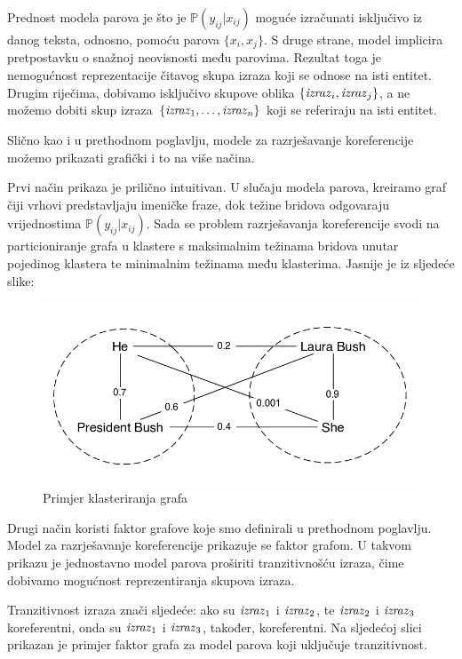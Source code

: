 \documentclass[a4paper,twoside,12pt]{memoir} %
\newcommand{\ti}[1]{\textit{#1\/}}
\begin{document}
	\bigskip

	Prednost modela parova je što je $\mathbb{P} (y_{ij} | x_{ij})$  moguće izračunati isključivo iz danog teksta, odnosno, pomoću parova $\{x_i, x_j\}$. S druge strane, model implicira pretpostavku o snažnoj neovisnosti među parovima. Rezultat toga je nemogućnost reprezentacije čitavog skupa izraza koji se odnose na isti entitet. Drugim riječima, dobivamo isključivo skupove oblika $\{ \ti{izraz}_i, \ti{izraz}_j\}$, a ne možemo dobiti skup izraza $\{ \ti{izraz}_1, \ldots, \ti{izraz}_n\}$ koji se referiraju na isti entitet.

	\bigskip

	Slično kao i u prethodnom poglavlju, modele za razrješavanje koreferencije možemo prikazati grafički i to na više načina.

	Prvi način prikaza je prilično intuitivan. U slučaju modela parova, kreiramo graf čiji vrhovi predstavljaju imeničke fraze, dok težine bridova odgovaraju vrijednostima $\mathbb{P}(y_{ij} | x_{ij})$. Sada se problem razrješavanja koreferencije svodi na particioniranje grafa u klastere s maksimalnim težinama bridova unutar pojedinog klastera te minimalnim težinama među klasterima. Jasnije je iz sljedeće slike:

	\vspace*{-6pt}
	\begin{figure}[H]
		\centering
		\includegraphics[scale = 0.5]{coreference_example.png}
		\caption{Primjer klasteriranja grafa}
	\end{figure}

	Drugi način koristi faktor grafove koje smo definirali u prethodnom poglavlju. Model za razrješavanje koreferencije prikazuje se faktor grafom. U takvom prikazu je jednostavno model parova proširiti tranzitivnošću izraza, čime dobivamo mogućnost reprezentiranja skupova izraza.

	Tranzitivnost izraza znači sljedeće: ako su $\ti{izraz}_1$ i $\ti{izraz}_2$, te $\ti{izraz}_2$ i $\ti{izraz}_3$ koreferentni, onda su $\ti{izraz}_1$ i $\ti{izraz}_3$, također, koreferentni. Na sljedećoj slici prikazan je primjer faktor grafa za model parova koji uključuje tranzitivnost.
\end{document}
